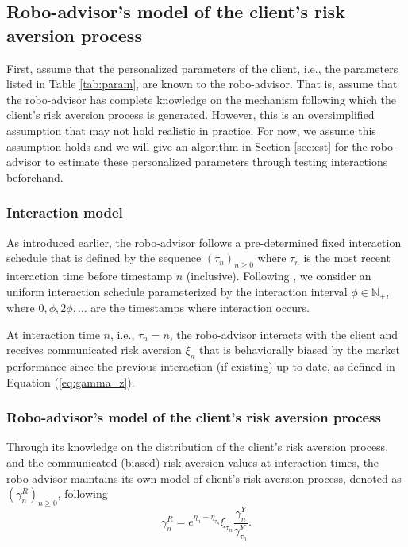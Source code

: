 \subsection{Robo-advisor's model of the client's risk aversion process}
First,  assume that the personalized parameters of the client, i.e., the parameters listed in Table \ref{tab:param}, are known to the robo-advisor. That is,  assume that the robo-advisor has complete knowledge on the mechanism following which the client's risk aversion process is generated. However, this is an oversimplified assumption that may not hold realistic in practice. For now, we assume this assumption holds and we will give an algorithm in Section \ref{sec:est} for the robo-advisor to estimate these personalized parameters through testing interactions beforehand.

\subsubsection{Interaction model} As introduced earlier, the robo-advisor follows a pre-determined fixed interaction schedule that is defined by the sequence $(\tau_n)_{n\geq0}$ where $\tau_n$ is the most recent interaction time before timestamp $n$ (inclusive). Following , we consider an uniform interaction schedule parameterized by the interaction interval $\phi\in\mathbb{N}_+$, where $0,\phi,2\phi,\ldots$ are the timestamps where interaction occurs.

At interaction time $n$, i.e., $\tau_n=n$, the robo-advisor interacts with the client and receives communicated risk aversion $\xi_n$ that is behaviorally biased by the market performance since the previous interaction (if existing) up to date, as defined in Equation (\ref{eq:gamma_z}).

\subsubsection{Robo-advisor's model of the client's risk aversion process}

Through its knowledge on the distribution of the client's risk aversion process, and the communicated (biased) risk aversion values at interaction times, the robo-advisor maintains its own model of client's risk aversion process, denoted as $(\gamma_n^R)_{n\geq0}$, following \begin{equation}
    \label{eq:gamma_r}
    \gamma_n^R=e^{\eta_n-\eta_{\tau_n}}\xi_{\tau_n}\frac{\gamma_n^Y}{\gamma^Y_{\tau_n}}.
\end{equation}

